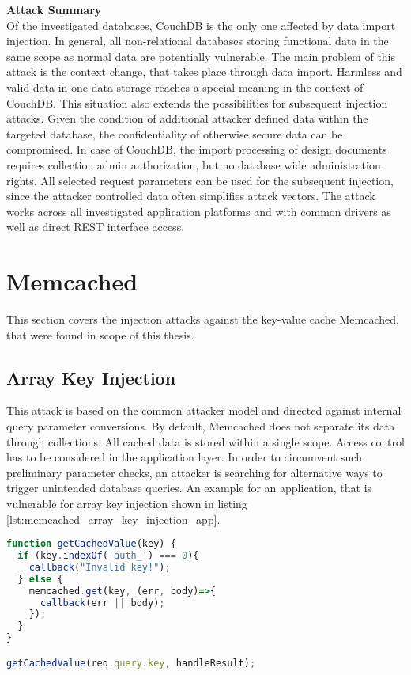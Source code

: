 \textbf{Attack Summary} \\
Of the investigated databases, CouchDB is the only one affected by data import injection. In general, all non-relational databases storing functional data in the same scope as normal data are potentially vulnerable. The main problem of this attack is the context change, that takes place through data import. Harmless and valid data in one data storage reaches a special meaning in the context of CouchDB. This situation also extends the possibilities for subsequent injection attacks. Given the condition of additional attacker defined data within the targeted database, the confidentiality of otherwise secure data can be compromised. In case of CouchDB, the import processing of design documents requires collection admin authorization, but no database wide administration rights. All selected request parameters can be used for the subsequent injection, since the attacker controlled data often simplifies attack vectors. The attack works across all investigated application platforms and with common drivers as well as direct REST interface access. 

\section{Memcached}
This section covers the injection attacks against the key-value cache Memcached, that were found in scope of this thesis.
\subsection{Array Key Injection}
This attack is based on the common attacker model and directed against internal query parameter conversions. By default, Memcached does not separate its data through collections. All cached data is stored within a single scope. Access control has to be considered in the application layer. In order to circumvent such preliminary parameter checks, an attacker is searching for alternative ways to trigger unintended database queries. An example for an application, that is vulnerable for array key injection shown in listing \ref{lst:memcached_array_key_injection_app}.\\

\begin{lstlisting}[caption={Vulnerable NodeJS example for array key injection against Memcached}, label={lst:memcached_array_key_injection_app}, language=JavaScript]
function getCachedValue(key) {
  if (key.indexOf('auth_') === 0){
    callback("Invalid key!");
  } else {
    memcached.get(key, (err, body)=>{
      callback(err || body);
    });
  }
}

getCachedValue(req.query.key, handleResult);
\end{lstlisting}


